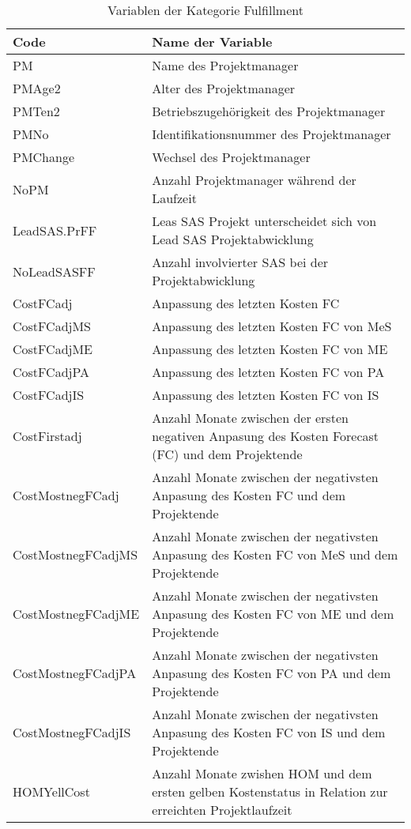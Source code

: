 \begin{longtable}[ht]{p{}p{}}
 	\caption{Variablen der Kategorie Fulfillment}\\
 	\toprule
		\textbf{Code} & \textbf{Name der Variable} \\ 
		\midrule
		\endfirsthead 
		PM    & Name des Projektmanager \\
		PMAge2 & Alter des Projektmanager \\
		PMTen2 & Betriebszugehörigkeit des Projektmanager  \\
		PMNo  & Identifikationsnummer des Projektmanager  \\
		PMChange & Wechsel des Projektmanager \\
		NoPM  & Anzahl Projektmanager während der Laufzeit \\
		LeadSAS.PrFF & Leas SAS Projekt unterscheidet sich von Lead SAS Projektabwicklung \\
		NoLeadSASFF & Anzahl involvierter SAS bei der Projektabwicklung\\
		CostFCadj & Anpassung des letzten Kosten FC \\
		CostFCadjMS & Anpassung des letzten Kosten FC von MeS \\
		CostFCadjME & Anpassung des letzten Kosten FC von ME \\
		CostFCadjPA & Anpassung des letzten Kosten FC von PA \\
		CostFCadjIS & Anpassung des letzten Kosten FC von IS \\
		CostFirstadj & Anzahl Monate zwischen der ersten  negativen Anpasung des Kosten Forecast (FC) und dem Projektende \\
		CostMostnegFCadj & Anzahl Monate zwischen der negativsten Anpasung des Kosten FC und dem Projektende \\
		CostMostnegFCadjMS & Anzahl Monate zwischen der negativsten Anpasung des Kosten FC  von MeS und dem Projektende  \\
		CostMostnegFCadjME & Anzahl Monate zwischen der negativsten Anpasung des Kosten FC  von ME und dem Projektende  \\
		CostMostnegFCadjPA & Anzahl Monate zwischen der negativsten Anpasung des Kosten FC  von PA und dem Projektende  \\
		CostMostnegFCadjIS & Anzahl Monate zwischen der negativsten Anpasung des Kosten FC  von IS und dem Projektende  \\
		HOMYellCost & Anzahl Monate zwishen HOM und dem ersten gelben Kostenstatus in Relation zur erreichten Projektlaufzeit \\

\end{longtable}
